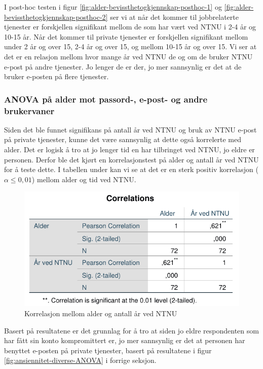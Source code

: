 I post-hoc testen i figur \ref{fig:alder-bevissthetogkjennskap-posthoc-1} og \ref{fig:alder-bevissthetogkjennskap-posthoc-2} ser vi at når det kommer til jobbrelaterte tjenester er forskjellen signifikant mellom de som har vært ved NTNU i 2-4 år og 10-15 år. Når det kommer til private tjenester er forskjellen signifikant mellom under 2 år og over 15, 2-4 år og over 15, og mellom 10-15 år og over 15. Vi ser at det er en relasjon mellom hvor mange år ved NTNU de og om de bruker NTNU e-post på andre tjenester. Jo lenger de er der, jo mer sannsynlig er det at de bruker e-posten på flere tjenester. 

\subsubsection{ANOVA på alder mot passord-, e-post- og andre brukervaner}
Siden det ble funnet signifikans på antall år ved NTNU og bruk av NTNU e-post på private tjenester, kunne det være sannsynlig at dette også korrelerte med alder. Det er logisk å tro at jo lenger tid en har tilbringet ved NTNU, jo eldre er personen. Derfor ble det kjørt en korrelasjonstest på alder og antall år ved NTNU for å teste dette. I tabellen under kan vi se at det er en sterk positiv korrelasjon (\(\alpha \le 0,01\)) mellom alder og tid ved NTNU.

\begin{figure}[H]
    \centering
    \includegraphics[scale=1]{case_2/bilder/spss/anova_ttest/alder_aarvedNTNU_korrelasjon.pdf}
    \caption[Korrelasjon mellom alder og antall år ved NTNU]{Korrelasjon mellom alder og antall år ved NTNU}
    \label{fig:alder-aarvedNTNU-korrelasjon}
\end{figure}

Basert på resultatene er det grunnlag for å tro at siden jo eldre respondenten som har fått sin konto kompromittert er, jo mer sannsynlig er det at personen har benyttet e-posten på private tjenester, basert på resultatene i figur \ref{fig:ansiennitet-diverse-ANOVA} i forrige seksjon.

